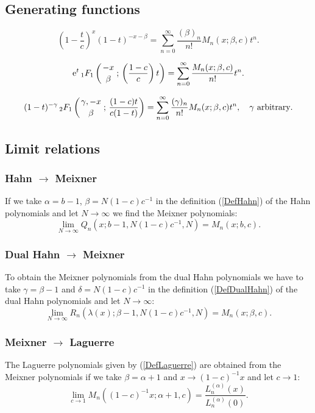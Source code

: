 \documentclass[envcountchap,graybox]{svmono}
\newcounter{rom}
\newcommand{\hyp}[5]{\mbox{}_{#1}{F}_{#2}
\left(\genfrac{}{}{0pt}{}{#3}{#4}\,;\,#5\right)}
\newcommand{\e}{\textrm{e}}
\begin{document}
\subsection*{Generating functions}
\begin{equation}
\label{GenMeixner1}
\left(1-\frac{t}{c}\right)^x(1-t)^{-x-\beta}=
\sum_{n=0}^{\infty}\frac{(\beta)_n}{n!}M_n(x;\beta,c)t^n.
\end{equation}

\begin{equation}
\label{GenMeixner2}
\e^t\,\hyp{1}{1}{-x}{\beta}{\left(\frac{1-c}{c}\right)t}=
\sum_{n=0}^{\infty}\frac{M_n(x;\beta,c)}{n!}t^n.
\end{equation}

\begin{equation}
\label{GenMeixner3}
(1-t)^{-\gamma}\,\hyp{2}{1}{\gamma,-x}{\beta}{\frac{(1-c)t}{c(1-t)}}
=\sum_{n=0}^{\infty}\frac{(\gamma)_n}{n!}M_n(x;\beta,c)t^n,
\quad\textrm{$\gamma$ arbitrary}.
\end{equation}

\subsection*{Limit relations}

\subsubsection*{Hahn $\rightarrow$ Meixner}
If we take $\alpha=b-1$, $\beta=N(1-c)c^{-1}$ in the definition (\ref{DefHahn})
of the Hahn polynomials and let $N\rightarrow\infty$ we find the Meixner polynomials:
$$\lim_{N\rightarrow\infty}
Q_n(x;b-1,N(1-c)c^{-1},N)=M_n(x;b,c).$$

\subsubsection*{Dual Hahn $\rightarrow$ Meixner}
To obtain the Meixner polynomials from the dual Hahn polynomials we have to take
$\gamma=\beta-1$ and $\delta=N(1-c)c^{-1}$ in the definition (\ref{DefDualHahn}) of
the dual Hahn polynomials and let $N\rightarrow\infty$:
$$\lim_{N\rightarrow\infty}
R_n(\lambda(x);\beta-1,N(1-c)c^{-1},N)=M_n(x;\beta,c).$$

\subsubsection*{Meixner $\rightarrow$ Laguerre}
The Laguerre polynomials given by (\ref{DefLaguerre}) are obtained from the Meixner polynomials
if we take $\beta=\alpha+1$ and $x\rightarrow (1-c)^{-1}x$ and let $c\rightarrow 1$:
\begin{equation}
\lim_{c\rightarrow 1}
M_n((1-c)^{-1}x;\alpha+1,c)=\frac{L_n^{(\alpha)}(x)}{L_n^{(\alpha)}(0)}.
\end{equation}
\end{document}
